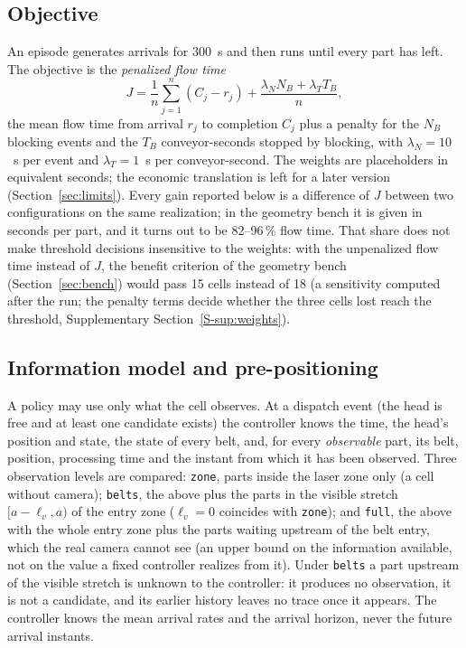 \documentclass[11pt,a4paper]{article}
\newcommand{\lv}{\ell_{v}}
\newcommand{\supsec}[1]{Supplementary Section~\ref{S-#1}}
\begin{document}
\subsection{Objective}
An episode generates arrivals for 300~s and then runs until every part has left. The
objective is the \emph{penalized flow time}
\begin{equation}
J=\frac{1}{n}\sum_{j=1}^{n}(C_j-r_j)+\frac{\lambda_N N_B+\lambda_T T_B}{n},
\end{equation}
the mean flow time from arrival $r_j$ to completion $C_j$ plus a penalty for the $N_B$
blocking events and the $T_B$ conveyor-seconds stopped by blocking, with $\lambda_N=10$~s
per event and $\lambda_T=1$~s per conveyor-second. The weights are placeholders in
equivalent seconds; the economic translation is left for a later version
(Section~\ref{sec:limits}). Every gain reported below is a difference of $J$ between two
configurations on the same realization; in the geometry bench it is given in seconds per
part, and it turns out to be 82--96\,\% flow time. That share does not make threshold
decisions insensitive to the weights: with the unpenalized flow time instead of $J$, the
benefit criterion of the geometry bench (Section~\ref{sec:bench}) would pass 15 cells
instead of 18 (a sensitivity computed after the run; the penalty terms decide whether the
three cells lost reach the threshold, \supsec{sup:weights}).

\subsection{Information model and pre-positioning}
A policy may use only what the cell observes. At a dispatch event (the head is free and at
least one candidate exists) the controller knows the time, the head's position and state,
the state of every belt, and, for every \emph{observable} part, its belt, position,
processing time and the instant from which it has been observed. Three observation levels
are compared: \texttt{zone}, parts inside the laser zone only (a cell without camera);
\texttt{belts}, the above plus the parts in the visible stretch $[a-\lv,a)$ of the entry
zone ($\lv=0$ coincides with \texttt{zone}); and \texttt{full}, the above with the whole
entry zone plus the parts waiting upstream of the belt entry, which the real camera cannot
see (an upper bound on the information available, not on the value a fixed controller
realizes from it). Under \texttt{belts} a part upstream of the visible stretch is unknown
to the controller: it produces no observation, it is not a candidate, and its earlier
history leaves no trace once it appears. The controller knows the mean arrival rates and
the arrival horizon, never the future arrival instants.
\end{document}
